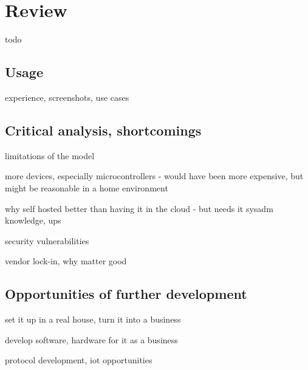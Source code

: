 \chapter{Review} %

todo

\section{Usage}

experience, screenshots, use cases

\section{Critical analysis, shortcomings}

limitations of the model

more devices, especially microcontrollers - would have been more expensive, but might be reasonable in a home environment

why self hosted better than having it in the cloud - but needs it sysadm knowledge, ups

security vulnerabilities

vendor lock-in, why matter good

\section{Opportunities of further development}

set it up in a real house, turn it into a business

develop software, hardware for it as a business

protocol development, iot opportunities

